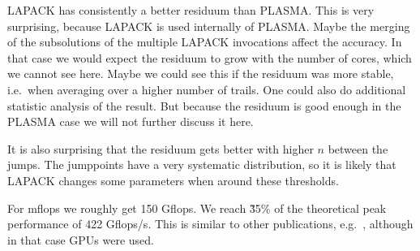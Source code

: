 \documentclass[a4paper,final,ngerman,english]{article}
\begin{document}
LAPACK has consistently a better residuum than PLASMA.\@
This is very surprising, because LAPACK is used internally of PLASMA.\@
Maybe the merging of the subsolutions of the multiple LAPACK invocations affect the accuracy.
In that case we would expect the residuum to grow with the number of cores, which we cannot see here.
Maybe we could see this if the residuum was more stable, i.e.\ when averaging over a higher number of trails.
One could also do additional statistic analysis of the result.
But because the residuum is good enough in the PLASMA case we will not further discuss it here.

It is also surprising that the residuum gets better with higher $n$ between the jumps.
The jumppoints have a very systematic distribution, so it is likely that
LAPACK changes some parameters when around these thresholds.

For mflops we roughly get 150 Gflops.
We reach \~35\% of the theoretical peak performance of 422 Gflops/s.
This is similar to other publications, e.g.~\cite{lawn266},
although in that case GPUs were used.

%  
\begin{footnotesize}
\end{footnotesize}
\end{document}
